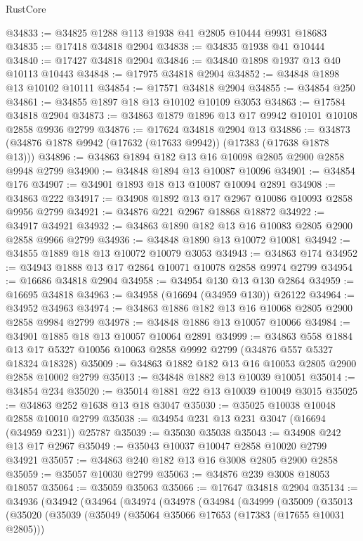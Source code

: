 \begin{lexlean}{RustCore}
\begin{coremodule}
@34833 := @34825 @1288 @113 @1938 @41 @2805 @10444 @9931 @18683
@34835 := @17418 @34818 @2904
@34838 := @34835 @1938 @41 @10444
@34840 := @17427 @34818 @2904
@34846 := @34840 @1898 @1937 @13 @40 @10113 @10443
@34848 := @17975 @34818 @2904
@34852 := @34848 @1898 @13 @10102 @10111
@34854 := @17571 @34818 @2904
@34855 := @34854 @250
@34861 := @34855 @1897 @18 @13 @10102 @10109 @3053
@34863 := @17584 @34818 @2904
@34873 := @34863 @1879 @1896 @13 @17 @9942 @10101 @10108 @2858 @9936 @2799
@34876 := @17624 @34818 @2904 @13
@34886 := @34873 (@34876 @1878 @9942 (@17632 (@17633 @9942)) (@17383 (@17638 @1878 @13)))
@34896 := @34863 @1894 @182 @13 @16 @10098 @2805 @2900 @2858 @9948 @2799
@34900 := @34848 @1894 @13 @10087 @10096
@34901 := @34854 @176
@34907 := @34901 @1893 @18 @13 @10087 @10094 @2891
@34908 := @34863 @222
@34917 := @34908 @1892 @13 @17 @2967 @10086 @10093 @2858 @9956 @2799
@34921 := @34876 @221 @2967 @18868 @18872
@34922 := @34917 @34921
@34932 := @34863 @1890 @182 @13 @16 @10083 @2805 @2900 @2858 @9966 @2799
@34936 := @34848 @1890 @13 @10072 @10081
@34942 := @34855 @1889 @18 @13 @10072 @10079 @3053
@34943 := @34863 @174
@34952 := @34943 @1888 @13 @17 @2864 @10071 @10078 @2858 @9974 @2799
@34954 := @16686 @34818 @2904
@34958 := @34954 @130 @13 @130 @2864
@34959 := @16695 @34818
@34963 := @34958 (@16694 (@34959 @130)) @26122
@34964 := @34952 @34963
@34974 := @34863 @1886 @182 @13 @16 @10068 @2805 @2900 @2858 @9984 @2799
@34978 := @34848 @1886 @13 @10057 @10066
@34984 := @34901 @1885 @18 @13 @10057 @10064 @2891
@34999 := @34863
    @558
    @1884
    @13
    @17
    @5327
    @10056
    @10063
    @2858
    @9992
    @2799
    (@34876 @557 @5327 @18324 @18328)
@35009 := @34863 @1882 @182 @13 @16 @10053 @2805 @2900 @2858 @10002 @2799
@35013 := @34848 @1882 @13 @10039 @10051
@35014 := @34854 @234
@35020 := @35014 @1881 @22 @13 @10039 @10049 @3015
@35025 := @34863 @252 @1638 @13 @18 @3047
@35030 := @35025 @10038 @10048 @2858 @10010 @2799
@35038 := @34954 @231 @13 @231 @3047 (@16694 (@34959 @231)) @25787
@35039 := @35030 @35038
@35043 := @34908 @242 @13 @17 @2967
@35049 := @35043 @10037 @10047 @2858 @10020 @2799 @34921
@35057 := @34863 @240 @182 @13 @16 @3008 @2805 @2900 @2858
@35059 := @35057 @10030 @2799
@35063 := @34876 @239 @3008 @18053 @18057
@35064 := @35059 @35063
@35066 := @17647 @34818 @2904
@35134 := @34936
    (@34942
      (@34964
        (@34974
          (@34978
            (@34984
              (@34999
                (@35009
                  (@35013
                    (@35020
                      (@35039
                        (@35049
                          (@35064 @35066 @17653 (@17383 (@17655 @10031 @2805)))

\end{coremodule}
\end{lexlean}
